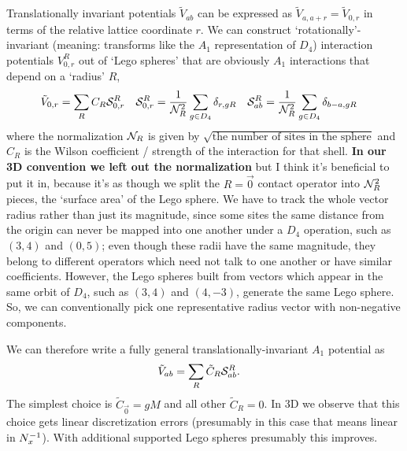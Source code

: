 Translationally invariant potentials $\tilde{V}_{ab}$ can be expressed as $\tilde{V}_{a,a+r} = \tilde{V}_{0,r}$  in terms of the relative lattice coordinate $r$.
We can construct `rotationally'-invariant (meaning: transforms like the $A_1$ representation of $D_4$) interaction potentials $V^R_{0,r}$ out of `Lego spheres'  that are obviously $A_1$ interactions that depend on a `radius' $R$,
\begin{align}
    \tilde{V}_{0,r} &= \sum_{R} C_R \mathcal{S}^{R}_{0,r}
    &
    \mathcal{S}^{R}_{0,r} &= \frac{1}{\mathcal{N}_{R}^2}\sum_{g \in D_4} \delta_{r, gR}
    &
    \mathcal{S}^{R}_{ab} &= \frac{1}{\mathcal{N}_{R}^2}\sum_{g \in D_4} \delta_{b-a,gR}
    \label{eq:Lego sphere}
\end{align}
where the normalization $\mathcal{N}_{R}$ is given by $\sqrt{\textrm{the number of sites in the sphere}}$ and $C_R$ is the Wilson coefficient / strength of the interaction for that shell.
{\bf In our 3D convention we left out the normalization} but I think it's beneficial to put it in, because it's as though we split the $R=\vec{0}$ contact operator into $\mathcal{N}_{R}^2$ pieces, the `surface area' of the Lego sphere.
We have to track the whole vector radius rather than just its magnitude, since some sites the same distance from the origin can never be mapped into one another under a $D_4$ operation, such as $(3,4)$ and $(0,5)$; even though these radii have the same magnitude, they belong to different operators which need not talk to one another or have similar coefficients.
However, the Lego spheres built from vectors which appear in the same orbit of $D_4$, such as $(3,4)$ and $(4,-3)$, generate the same Lego sphere.
So, we can conventionally pick one representative radius vector with non-negative components.

We can therefore write a fully general translationally-invariant $A_1$ potential as
\begin{align}
	\tilde{V}_{ab} &= \sum_{R} \tilde{C}_R \mathcal{S}^{R}_{ab}.
\end{align}
The simplest choice is $\tilde{C}_{\vec{0}} = gM$ and all other $\tilde{C}_R=0$.
In 3D we observe that this choice gets linear discretization errors (presumably in this case that means linear in $N_x^{-1}$).
With additional supported Lego spheres presumably this improves.
